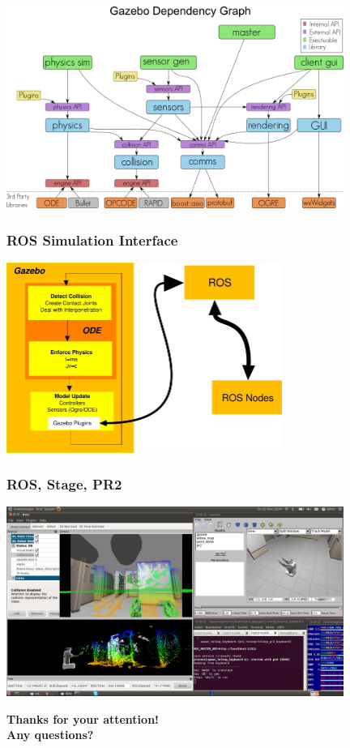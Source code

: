 \documentclass[t]{beamer}
\begin{document}
\begin{frame}
\includegraphics[width=11cm]{img/gazebo_dependency_graph.png}
\end{frame}

\begin{frame}
  \frametitle{ROS Simulation Interface}
\hspace{5ex}\includegraphics[width=9cm]{img/ros_simulation_interface.jpg}
\end{frame}

\begin{frame}
  \frametitle{ROS, Stage, PR2}
\includegraphics[width=11cm]{img/race_pr2_ros_rviz2.png}
\end{frame}

\begin{frame}
\vspace{2cm}
\centering\textbf{Thanks for your attention!\\}
\vspace{0.7cm}
\centering\textbf{Any questions?\\}
\end{frame}
\end{document}

